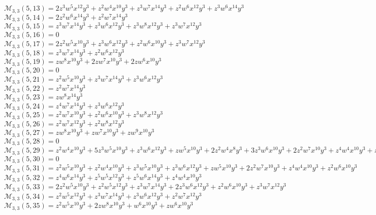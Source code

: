$\mathcal{M}_{3,3}(5,13)=2z^3w^5x^{12}y^3+z^2w^4x^{10}y^3+z^3w^7x^{14}y^3+z^2w^6x^{12}y^3+z^3w^6x^{14}y^3$\\
$\mathcal{M}_{3,3}(5,14)=2z^2w^6x^{14}y^3+z^2w^7x^{14}y^3$\\
$\mathcal{M}_{3,3}(5,15)=z^3w^7x^{14}y^3+z^3w^6x^{12}y^3+z^3w^8x^{12}y^3+z^3w^7x^{12}y^3$\\
$\mathcal{M}_{3,3}(5,16)=0$\\
$\mathcal{M}_{3,3}(5,17)=2z^2w^5x^{10}y^3+z^3w^6x^{12}y^3+z^2w^6x^{10}y^3+z^3w^7x^{12}y^3$\\
$\mathcal{M}_{3,3}(5,18)=z^3w^7x^{14}y^3+z^2w^6x^{12}y^3$\\
$\mathcal{M}_{3,3}(5,19)=zw^8x^{10}y^3+2zw^7x^{10}y^3+2zw^6x^{10}y^3$\\
$\mathcal{M}_{3,3}(5,20)=0$\\
$\mathcal{M}_{3,3}(5,21)=z^2w^5x^{10}y^3+z^3w^7x^{14}y^3+z^3w^6x^{12}y^3$\\
$\mathcal{M}_{3,3}(5,22)=z^2w^7x^{14}y^3$\\
$\mathcal{M}_{3,3}(5,23)=zw^8x^{14}y^3$\\
$\mathcal{M}_{3,3}(5,24)=z^4w^7x^{14}y^3+z^3w^6x^{12}y^3$\\
$\mathcal{M}_{3,3}(5,25)=z^2w^7x^{10}y^3+z^2w^6x^{10}y^3+z^3w^8x^{12}y^3$\\
$\mathcal{M}_{3,3}(5,26)=z^2w^7x^{12}y^3+z^2w^8x^{12}y^3$\\
$\mathcal{M}_{3,3}(5,27)=zw^8x^{10}y^3+zw^7x^{10}y^3+zw^9x^{10}y^3$\\
$\mathcal{M}_{3,3}(5,28)=0$\\
$\mathcal{M}_{3,3}(5,29)=z^2w^4x^{10}y^3+5z^3w^5x^{10}y^3+z^3w^6x^{12}y^3+zw^5x^{10}y^3+2z^2w^4x^8y^3+3z^3w^6x^{10}y^3+2z^2w^7x^{10}y^3+z^4w^4x^{10}y^3+z^2w^5x^8y^3$\\
$\mathcal{M}_{3,3}(5,30)=0$\\
$\mathcal{M}_{3,3}(5,31)=z^2w^5x^{10}y^3+z^2w^4x^{10}y^3+z^3w^5x^{10}y^3+z^3w^6x^{12}y^3+zw^5x^{10}y^3+2z^2w^7x^{10}y^3+z^4w^4x^{10}y^3+z^2w^6x^{10}y^3$\\
$\mathcal{M}_{3,3}(5,32)=z^4w^6x^{14}y^3+z^5w^5x^{12}y^3+z^5w^6x^{14}y^3+z^4w^4x^{10}y^3$\\
$\mathcal{M}_{3,3}(5,33)=2z^2w^5x^{10}y^3+z^2w^5x^{12}y^3+z^3w^7x^{14}y^3+2z^3w^6x^{12}y^3+z^2w^6x^{10}y^3+z^3w^7x^{12}y^3$\\
$\mathcal{M}_{3,3}(5,34)=z^2w^5x^{12}y^3+z^3w^7x^{14}y^3+z^3w^6x^{12}y^3+z^2w^7x^{12}y^3$\\
$\mathcal{M}_{3,3}(5,35)=z^2w^5x^{10}y^3+2zw^8x^{10}y^3+w^6x^{10}y^3+zw^6x^{10}y^3$\\
